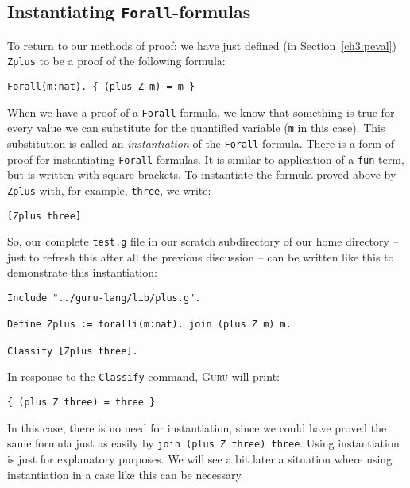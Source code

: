 \documentclass{book}[12pt]
\newcommand{\guru}[0]{\textsc{Guru}\xspace}
\begin{document}
\subsection{Instantiating \texttt{Forall}-formulas}

To return to our methods of proof: we have just defined (in
Section~\ref{ch3:peval}) \texttt{Zplus} to be a proof of the following
formula:

\begin{verbatim}
Forall(m:nat). { (plus Z m) = m }
\end{verbatim}

\noindent When we have a proof of a \texttt{Forall}-formula, we know
that something is true for every value we can substitute for the
quantified variable (\texttt{m} in this case).  This substitution is
called an \emph{instantiation} of the \texttt{Forall}-formula.  There
is a form of proof for instantiating \texttt{Forall}-formulas.  It is
similar to application of a \texttt{fun}-term, but is written with
square brackets.  To instantiate the formula proved above by
\texttt{Zplus} with, for example, \texttt{three}, we write:

\begin{verbatim}
[Zplus three]
\end{verbatim}

\noindent So, our complete \texttt{test.g} file in our scratch
subdirectory of our home directory -- just to refresh this after
all the previous discussion -- can be written like this to demonstrate
this instantiation:

\begin{verbatim}
Include "../guru-lang/lib/plus.g".

Define Zplus := foralli(m:nat). join (plus Z m) m.

Classify [Zplus three].
\end{verbatim}

\noindent In response to the \texttt{Classify}-command, \guru will print:

\begin{verbatim}
{ (plus Z three) = three }
\end{verbatim}

\noindent In this case, there is no need for instantiation, since we
could have proved the same formula just as easily by \texttt{join
(plus Z three) three}.  Using instantiation is just for explanatory
purposes.  We will see a bit later a situation where using
instantiation in a case like this can be necessary.
\end{document}
